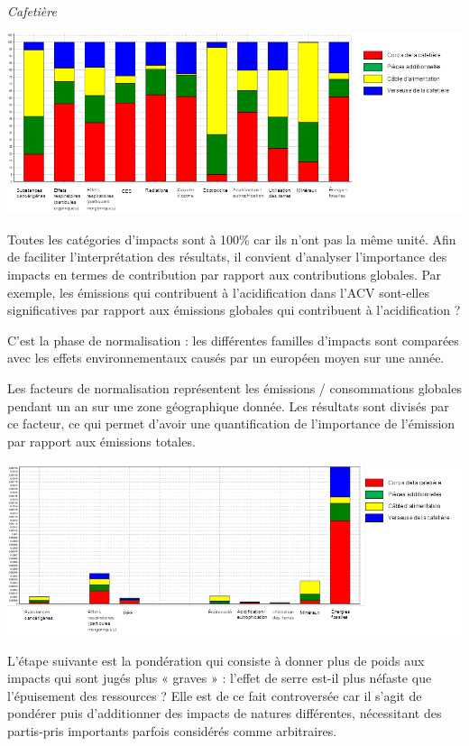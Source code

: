 \documentclass[11pt,oneside]{article}
\begin{document}
\begin{exemple}

\textit{Cafetière}
\begin{center}
\includegraphics[width=.8\textwidth]{png/acv1}
\end{center}

Toutes les catégories d’impacts sont à 100\% car ils n’ont pas la même unité.
Afin de faciliter l’interprétation des résultats, il convient d’analyser l’importance des impacts en termes de contribution par rapport aux contributions globales. Par exemple, les émissions qui contribuent à l’acidification dans l’ACV sont-elles significatives par rapport aux émissions globales qui contribuent à l’acidification ?

C’est la phase de normalisation : les différentes familles d’impacts sont comparées avec les effets environnementaux causés par un européen moyen sur une année.

Les facteurs de normalisation représentent les émissions / consommations globales pendant un an sur une zone géographique donnée. Les résultats sont divisés par ce facteur, ce qui permet d’avoir une quantification de l’importance de l’émission par rapport aux émissions totales.

\begin{center}
\includegraphics[width=.8\textwidth]{png/acv2}
\end{center}

L’étape suivante est la pondération qui consiste à donner plus de poids aux impacts qui sont jugés plus « graves » : l’effet de serre est-il plus néfaste que l’épuisement des ressources ? Elle est de ce fait controversée car il s’agit de pondérer puis d’additionner des impacts de natures différentes, nécessitant des partis-pris importants parfois considérés comme arbitraires.


\end{exemple}
\end{document}
